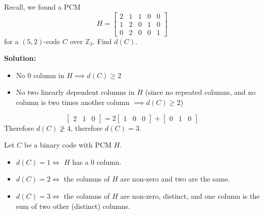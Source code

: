 \begin{exbox}
    \begin{example}
        Recall, we found a PCM
        \[ H=
            \left[\begin{array}{cc|ccc}
                    2 & 1 & 1 & 0 & 0 \\
                    1 & 2 & 0 & 1 & 0 \\
                    0 & 2 & 0 & 0 & 1
                \end{array}\right] \]
        for a $ (5,2) $-code $ C $ over $ \mathbb{Z}_3 $. Find $ d(C) $.

        \textbf{Solution:}
        \begin{itemize}
            \item No $ 0 $ column in $ H\implies d(C)\geqslant 2 $
            \item No two linearly dependent columns in $ H $ (since
                  no repeated columns, and no column is two times another
                  column $ \implies d(C)\geqslant 2 $)
        \end{itemize}
        \[ \begin{bmatrix} 2 & 1 & 0 \end{bmatrix}
            = 2\begin{bmatrix} 1 & 0 & 0 \end{bmatrix}
            + \begin{bmatrix} 0 & 1 & 0 \end{bmatrix} \]
        Therefore $ d(C)\ngeqslant 4 $, therefore $ d(C)=3 $.
    \end{example}
\end{exbox}

\begin{exbox}
    \begin{example}
        Let $ C $ be a binary code with PCM $ H $.
        \begin{itemize}
            \item $ d(C)=1\iff  $ $ H $ has a $ 0 $ column.
            \item $ d(C)=2\iff $ the columns of $ H $ are non-zero and two are
                  the same.
            \item $ d(C)=3\iff $ the columns of $ H $ are non-zero, distinct, and one
                  column is the sum of two other (distinct) columns.
        \end{itemize}
    \end{example}
\end{exbox}

